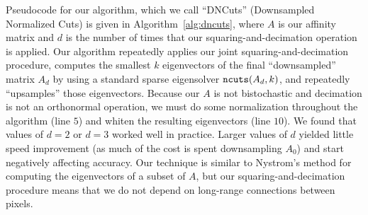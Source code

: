 \documentclass[10pt,journal,cspaper,compsoc]{IEEEtran}
\begin{document}
Pseudocode for our algorithm, which we call ``DNCuts'' (Downsampled Normalized Cuts) is given in Algorithm~\ref{alg:dncuts}, where $A$ is our affinity matrix and $d$ is the number of times that our squaring-and-decimation operation is applied.
Our algorithm repeatedly applies our joint squaring-and-decimation procedure, computes the smallest $k$ eigenvectors of the final ``downsampled'' matrix $A_d$ by using a standard sparse eigensolver ${\tt ncuts}(A_d, k)$, and repeatedly ``upsamples'' those eigenvectors.
Because our $A$ is not bistochastic and  decimation is not an orthonormal operation, we must do some normalization throughout the algorithm (line $5$) and whiten the resulting eigenvectors (line $10$).
We found that values of $d=2$ or $d=3$ worked well in practice.
Larger values of $d$ yielded little speed improvement (as much of the cost is spent downsampling $A_0$) and start negatively affecting accuracy. 
Our technique is similar to Nystrom's method for computing the eigenvectors of a subset of $A$, but our squaring-and-decimation procedure means that we do not depend on long-range connections between pixels.




\end{document}
